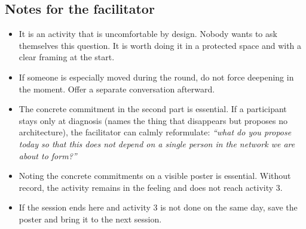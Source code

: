 \documentclass[11pt, a4paper]{article}
\begin{document}
\begin{actividad}
\subsection*{Notes for the facilitator}
\begin{itemize}
  \item It is an activity that is uncomfortable by design. Nobody wants to ask themselves this question. It is worth doing it in a protected space and with a clear framing at the start.
  \item If someone is especially moved during the round, do not force deepening in the moment. Offer a separate conversation afterward.
  \item The concrete commitment in the second part is essential. If a participant stays only at diagnosis (names the thing that disappears but proposes no architecture), the facilitator can calmly reformulate: \emph{``what do you propose today so that this does not depend on a single person in the network we are about to form?''}
  \item Noting the concrete commitments on a visible poster is essential. Without record, the activity remains in the feeling and does not reach activity 3.
  \item If the session ends here and activity 3 is not done on the same day, save the poster and bring it to the next session.
\end{itemize}

\end{actividad}

\newpage
\end{document}
